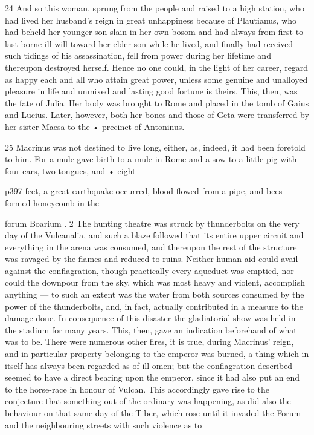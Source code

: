 24
And so this woman, sprung from the people and raised to a high station, who had lived her husband's reign in great unhappiness because of Plautianus, who had beheld her younger son slain in her own bosom and had always from first to last borne ill will toward her elder son while he lived, and finally had received such tidings of his assassination, fell from power during her lifetime and thereupon destroyed herself. Hence no one could, in the light of her career, regard as happy each and all who attain great power, unless some genuine and unalloyed pleasure in life and unmixed and lasting good fortune is theirs. This, then, was the fate of Julia. Her body was brought to Rome and placed in the tomb of Gaius and Lucius. Later, however, both her bones and those of Geta were transferred by her sister Maesa to the \texthebrew{•} precinct of Antoninus.

25
Macrinus was not destined to live long, either, as, indeed, it had been foretold to him. For a mule gave birth to a mule in Rome and a sow to a little pig with four ears, two tongues, and \texthebrew{•} eight

p397 feet, a great earthquake occurred, blood flowed from a pipe, and bees formed honeycomb in the

forum Boarium . 2 The hunting theatre was struck by thunderbolts on the very day of the Vulcanalia, and such a blaze followed that its entire upper circuit and everything in the arena was consumed, and thereupon the rest of the structure was ravaged by the flames and reduced to ruins. Neither human aid could avail against the conflagration, though practically every aqueduct was emptied, nor could the downpour from the sky, which was most heavy and violent, accomplish anything \texthebrew{—} to such an extent was the water from both sources consumed by the power of the thunderbolts, and, in fact, actually contributed in a measure to the damage done. In consequence of this disaster the gladiatorial show was held in the stadium for many years. This, then, gave an indication beforehand of what was to be. There were numerous other fires, it is true, during Macrinus' reign, and in particular property belonging to the emperor was burned, a thing which in itself has always been regarded as of ill omen; but the conflagration described seemed to have a direct bearing upon the emperor, since it had also put an end to the horse-race in honour of Vulcan. This accordingly gave rise to the conjecture that something out of the ordinary was happening, as did also the behaviour on that same day of the Tiber, which rose until it invaded the Forum and the neighbouring streets with such violence as to

